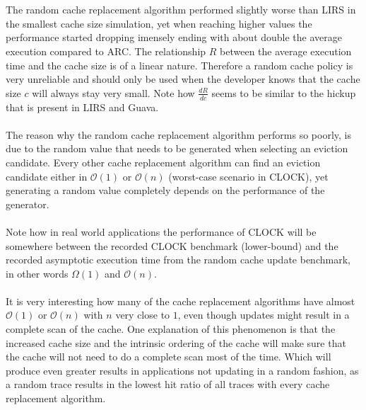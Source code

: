 \documentclass[pdftex,a4paper,12pt,twoside]{report}
\begin{document}
\\\\
The random cache replacement algorithm performed slightly worse than LIRS in the smallest cache size simulation, yet when reaching higher values the performance started dropping imensely ending with about double the average execution compared to ARC. The relationship $R$ between the average execution time and the cache size is of a linear nature. Therefore a random cache policy is very unreliable and should only be used when the developer knows that the cache size $c$ will always stay very small. Note how $\frac{dR}{dc}$ seems to be similar to the hickup that is present in LIRS and Guava.
\\\\
The reason why the random cache replacement algorithm performs so poorly, is due to the random value that needs to be generated when selecting an eviction candidate. Every other cache replacement algorithm can find an eviction candidate either in $\mathcal{O}(1)$ or $\mathcal{O}(n)$ (worst-case scenario in CLOCK), yet generating a random value completely depends on the performance of the generator.
\\\\
Note how in real world applications the performance of CLOCK will be somewhere between the recorded CLOCK benchmark (lower-bound) and the recorded asymptotic execution time from the random cache update benchmark, in other words $\Omega(1)$ and $\mathcal{O}(n)$.
\\\\
It is very interesting how many of the cache replacement algorithms have almost $\mathcal{O}(1)$ or $\mathcal{O}(n)$ with $n$ very close to $1$, even though updates might result in a complete scan of the cache. One explanation of this phenomenon is that the increased cache size and the intrinsic ordering of the cache will make sure that the cache will not need to do a complete scan most of the time. Which will produce even greater results in applications not updating in a random fashion, as a random trace results in the lowest hit ratio of all traces with every cache replacement algorithm.
\end{document}
